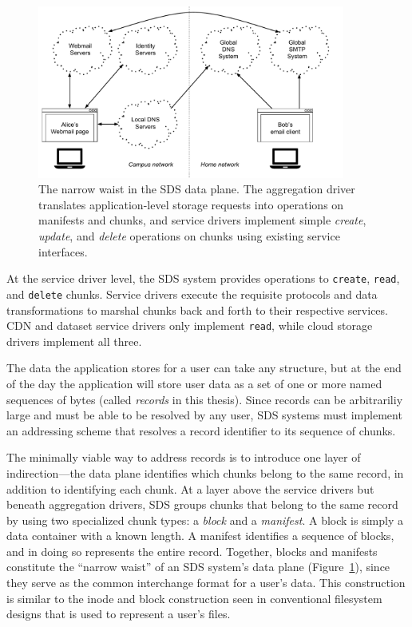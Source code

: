 \begin{figure}[h]
   \centering
   \includegraphics[width=0.9\textwidth,page=4]{figures/dissertation-figures}
   \caption{The narrow waist in the SDS data plane.  The aggregation driver
   translates application-level storage requests into operations on manifests
   and chunks, and service drivers implement simple \textit{create},
   \textit{update}, and \textit{delete} operations on chunks using existing
   service interfaces.}
   \label{fig:chap2-narrow-waist}
\end{figure}

At the service driver level, the SDS
system provides operations to \texttt{create}, \texttt{read}, and
\texttt{delete} chunks.  Service drivers execute the requisite protocols
and data transformations to
marshal chunks back and forth to their respective services.  CDN and dataset
service drivers only implement \texttt{read}, while cloud storage drivers
implement all three.

The data the application stores for a user can take any structure, but at the
end of the day the application will store user data as a set of one or more
named sequences of bytes (called \emph{records} in this thesis).  Since records
can be arbitrariliy large and must be able to be resolved by any user, SDS
systems must implement an addressing scheme that resolves a record identifier to
its sequence of chunks.

The minimally viable way to address records is to introduce one layer of
indirection---the data plane identifies which chunks belong to the same record,
in addition to identifying each chunk.
At a layer above the service drivers but beneath aggregation drivers, SDS
groups chunks that belong to the same record by using two specialized
chunk types:  a \emph{block} and a \emph{manifest}.  A block is simply a data
container with a known length.  A manifest identifies a sequence of blocks, and
in doing so represents the entire record.  Together, blocks and manifests
constitute the ``narrow waist'' of an SDS system's data plane
(Figure~\ref{fig:chap2-narrow-waist}), since they serve as the common
interchange format for a user's data.  This construction is similar to the
inode and block construction seen in conventional filesystem designs that is
used to represent a user's files.

